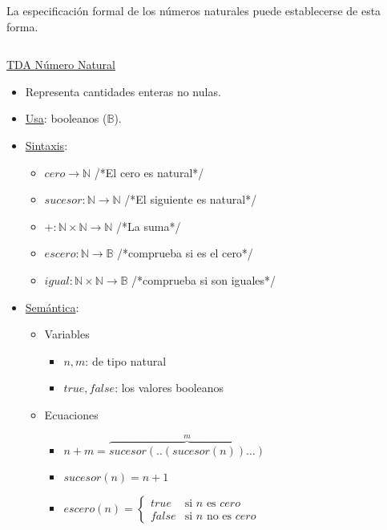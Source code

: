 \begin{example}
La especificación formal de los números naturales puede establecerse de esta forma.

$ $\hskip-0.5cm \ttfamily

\underline{TDA Número Natural}
\begin{itemize}
\item Representa cantidades enteras no nulas.

\item \underline{Usa}: booleanos  ($\mathbb{B}$).

\item \underline{Sintaxis}:
\begin{itemize}
\item $cero \rightarrow \mathbb{N}$	/*El cero es natural*/
\item $sucesor: \mathbb{N} \rightarrow \mathbb{N}$ /*El siguiente es natural*/
\item $+:\mathbb{N} \times \mathbb{N} \rightarrow \mathbb{N}$ /*La suma*/
\item $escero: \mathbb{N}\rightarrow \mathbb{B}$ /*comprueba si es el cero*/
\item $igual:\mathbb{N}\times \mathbb{N} \rightarrow \mathbb{B}$  /*comprueba si son iguales*/
\end{itemize}

\item \underline{Semántica}:
\begin{itemize}

\item Variables
\begin{itemize}
\item $n, m$: de tipo natural
\item $true, false$: los valores booleanos
\end{itemize}

\item Ecuaciones
\begin{itemize}
\item $n+m=\overbrace{sucesor(.. (sucesor(n))...)}^m$
\item $sucesor(n)=n+1$
\item $escero(n)=\left\{
\begin{array}{ll}
true & \mbox{si } n \mbox{ es } cero \\
false &\mbox{si } n \mbox{ no es } cero
\end{array}
\right.$
\end{itemize}

\end{itemize} %
\end{itemize}
\end{example}




